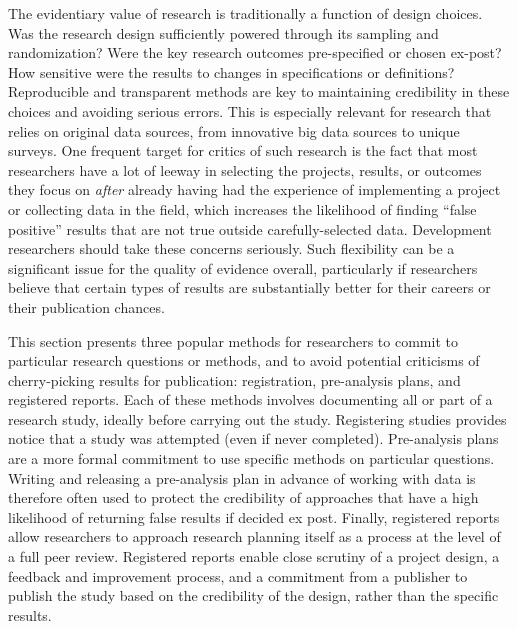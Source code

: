 The evidentiary value of research is traditionally a function of design choices.\cite{angrist2010credibility,ioannidis2005most}
Was the research design sufficiently powered through its sampling and randomization?
Were the key research outcomes pre-specified or chosen ex-post?
How sensitive were the results to changes in specifications or definitions?
Reproducible and transparent methods are key to maintaining credibility
in these choices and avoiding serious errors.\cite{christensen2019transparent}
This is especially relevant for research that relies on original data sources,
from innovative big data sources to unique surveys.
One frequent target for critics of such research\cite{ioannidis2017power}
is the fact that most researchers have a lot of leeway
in selecting the projects, results, or outcomes they focus on
\textit{after} already having had the experience of implementing a project
or collecting data in the field,
which increases the likelihood of finding ``false positive''
results that are not true outside carefully-selected data.
Development researchers should take these concerns seriously.
Such flexibility can be a significant issue for the quality of evidence overall,
particularly if researchers believe that certain types of results
are substantially better for their careers or their publication chances.

This section presents three popular methods
for researchers to commit to particular research questions or methods,
and to avoid potential criticisms of cherry-picking results for publication:
registration, pre-analysis plans, and registered reports.
Each of these methods involves documenting all or part of a research study,
ideally before carrying out the study.
Registering studies provides notice that a study was attempted (even if never completed).
Pre-analysis plans are a more formal commitment
to use specific methods on particular questions.
Writing and releasing a pre-analysis plan
in advance of working with data is therefore often used to protect the credibility
of approaches that have a high likelihood of returning false results if decided ex post.
Finally, registered reports allow researchers to approach research planning itself
as a process at the level of a full peer review.
Registered reports enable close scrutiny of a project design,
a feedback and improvement process,
and a commitment from a publisher to publish the study
based on the credibility of the design, rather than the specific results.

